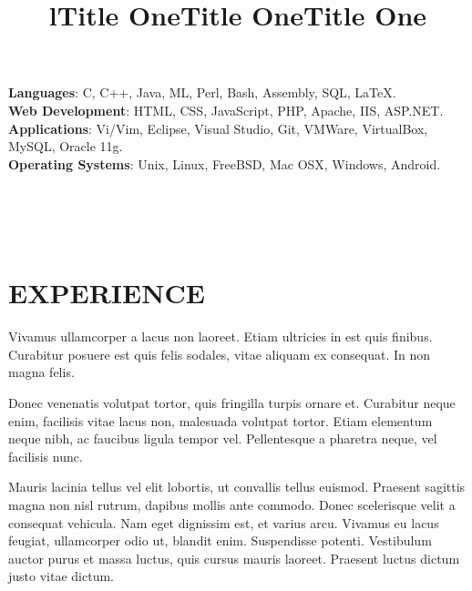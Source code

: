 \documentclass[margin]{res}
\begin{document}
\begin{resume}
  \textbf{Languages}: C, C++, Java, ML, Perl, Bash, Assembly, SQL, \LaTeX.
  \\
  \textbf{Web Development}: HTML, CSS, JavaScript, PHP, Apache, IIS, ASP.NET.
  \\
  \textbf{Applications}: Vi/Vim, Eclipse, Visual Studio, Git, VMWare, VirtualBox, 
  MySQL, Oracle 11g.
  \\
  \textbf{Operating Systems}: 
  Unix, Linux, FreeBSD, Mac OSX, Windows, Android.

\begin{format}
  \title{l}\\
  \\
  \body\\
\end{format}

\section{EXPERIENCE}
  \title{\textbf{Title One}}
  \begin{position}
    Vivamus ullamcorper a lacus non laoreet. Etiam ultricies in est quis finibus. 
    Curabitur posuere est quis felis sodales, vitae aliquam ex consequat. In non 
    magna felis.
  \end{position}

  \title{\textbf{Title One}}
  \begin{position}
    Donec venenatis volutpat tortor, quis fringilla turpis ornare et. Curabitur 
    neque enim, facilisis vitae lacus non, malesuada volutpat tortor. Etiam 
    elementum neque nibh, ac faucibus ligula tempor vel. Pellentesque a pharetra 
    neque, vel facilisis nunc.
  \end{position}

  \title{\textbf{Title One}}
  \begin{position}
    Mauris lacinia tellus vel elit lobortis, ut convallis tellus euismod. Praesent 
    sagittis magna non nisl rutrum, dapibus mollis ante commodo. Donec scelerisque 
    velit a consequat vehicula. Nam eget dignissim est, et varius arcu. Vivamus eu 
    lacus feugiat, ullamcorper odio ut, blandit enim. Suspendisse potenti. 
    Vestibulum auctor purus et massa luctus, quis cursus mauris laoreet. Praesent 
    luctus dictum justo vitae dictum.
  \end{position}

\end{resume}
\end{document}
